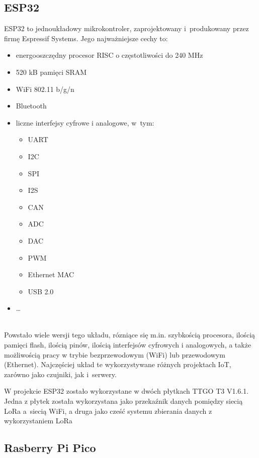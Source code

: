 \subsection{ESP32}
ESP32 to jednoukładowy mikrokontroler, zaprojektowany i~produkowany przez firmę Espressif Systems. Jego najważniejsze cechy to:
\begin{itemize}
    \item energooszczędny procesor RISC o częstotliwości do 240 MHz
    \item 520 kB pamięci SRAM
    \item WiFi 802.11 b/g/n
    \item Bluetooth
    \item liczne interfejsy cyfrowe i analogowe, w~tym:
          \begin{itemize}
              \item UART
              \item I2C
              \item SPI
              \item I2S
              \item CAN
              \item ADC
              \item DAC
              \item PWM
              \item Ethernet MAC
              \item USB 2.0
          \end{itemize}
    \item \dots
\end{itemize} \cite{ESP32:datasheet} \\
Powstało wiele wersji tego układu, rózniące się m.in. szybkością procesora, ilością pamięci flash, ilością pinów, ilością interfejsów cyfrowych i analogowych, a także możliwością pracy w trybie bezprzewodowym (WiFi) lub przewodowym (Ethernet)\cite{ESP32:socs}.
Najczęściej układ te wykorzystywane różnych projektach IoT, zarówno jako czujniki, jak i~serwery.\cite{ESP32:datasheet}


W projekcie ESP32 zostało wykorzystane w dwóch płytkach TTGO T3 V1.6.1. Jedna z płytek została wykorzystana jako przekaźnik danych pomiędzy siecią LoRa a~siecią WiFi, a druga jako cześć systemu zbierania danych z wykorzystaniem LoRa


\subsection{Rasberry Pi Pico}

